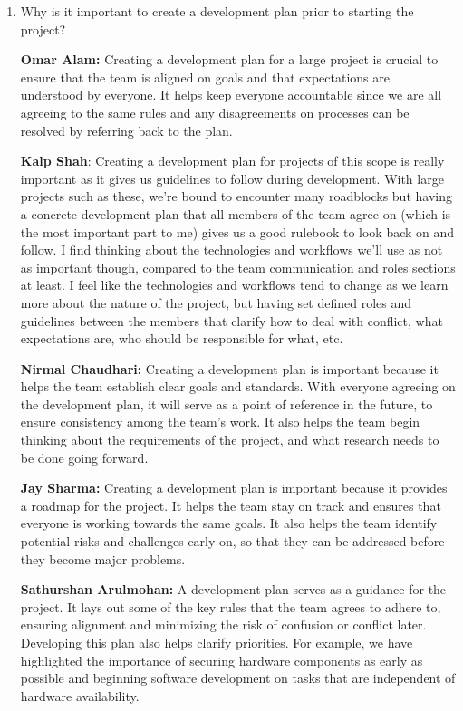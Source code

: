 \documentclass{article}
\begin{document}
\begin{enumerate}
    \item Why is it important to create a development plan prior to starting the
    project?

    \textbf{Omar Alam:} Creating a development plan for a large project is crucial to ensure that the team is aligned on goals
    and that expectations are understood by everyone. It helps keep everyone accountable since we are all agreeing to the same rules
    and any disagreements on processes can be resolved by referring back to the plan.

    \textbf{Kalp Shah}: Creating a development plan for projects of this scope is really important as it gives us guidelines to follow
    during development. With large projects such as these, we're bound to encounter many roadblocks but having a concrete development 
    plan that all members of the team agree on (which is the most important part to me) gives us a good rulebook to look back on and 
    follow. I find thinking about the technologies and workflows we'll use as not as important though, compared to the team communication 
    and roles sections at least. I feel like the technologies and workflows tend to change as we learn more about the nature of the 
    project, but having set defined roles and guidelines between the members that clarify how to deal with conflict, what expectations 
    are, who should be responsible for what, etc. 
    
    \textbf{Nirmal Chaudhari:} Creating a development plan is important because it helps the team establish clear goals and standards. 
    With everyone agreeing on the development plan, it will serve as a point of reference in the future, to ensure consistency among the team's work. 
    It also helps the team begin thinking about the requirements of the project, and what research needs to be done going forward. 

    \textbf{Jay Sharma:} Creating a development plan is important because it provides a roadmap for the project. It helps the team stay on track 
    and ensures that everyone is working towards the same goals. It also helps the team identify potential risks and challenges early on, so that 
    they can be addressed before they become major problems.

    \textbf{Sathurshan Arulmohan:} A development plan serves as a guidance for the project.
    It lays out some of the key rules that the team agrees to adhere to, ensuring alignment and minimizing the risk of confusion or conflict later.
    Developing this plan also helps clarify priorities.
    For example, we have highlighted the importance of securing hardware components as early as possible and beginning software development on tasks that are independent of hardware availability.


\end{enumerate}
\end{document}
